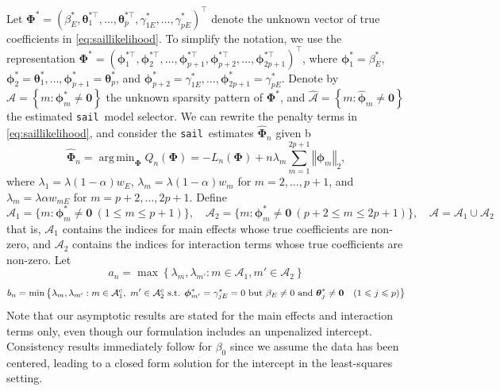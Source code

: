 \documentclass[useAMS,usenatbib,referee]{biom}
\newcommand{\ddd}{,\ldots,}
\newcommand{\sail}{\texttt{sail}}
\newcommand{\btheta}{\boldsymbol{\theta}}
\DeclareMathOperator*{\argmin}{arg\,min}
\newcommand{\A}{\mathcal{A}}
\begin{document}
{\normalsize{}Let $\boldsymbol{\Phi}^{*}=(\beta_{E}^{*},\btheta_{1}^{*\top},\ldots,\btheta_{p}^{*\top},\gamma_{1E}^{*},\ldots,\gamma_{pE}^{*})^{\top}$
	denote the unknown vector of true coefficients in \eqref{eq:saillikelihood}.
	To simplify the notation, we use the representation $\boldsymbol{\Phi}^{*}=(\boldsymbol{\phi}_{1}^{*\top},\boldsymbol{\phi}_{2}^{*\top},\ldots,\boldsymbol{\phi}_{p+1}^{*\top},\boldsymbol{\phi}_{p+2}^{*\top},\ldots,\boldsymbol{\phi}_{2p+1}^{*\top})^{\top}$,
	where $\boldsymbol{\phi}_{1}^{*}=\beta_{E}^{*}$, $\boldsymbol{\phi}_{2}^{*}=\boldsymbol{\theta}_{1}^{*}\ddd\boldsymbol{\phi}_{p+1}^{*}=\boldsymbol{\theta}_{p}^{*}$,
	and $\boldsymbol{\phi}_{p+2}^{*}=\gamma_{1E}^{*}\ddd\boldsymbol{\phi}_{2p+1}^{*}=\gamma_{pE}^{*}$.
	Denote by $\A=\left\lbrace m:\boldsymbol{\phi}_{m}^{*}\neq\mathbf{0}\right\rbrace $
	the unknown sparsity pattern of $\boldsymbol{\Phi}^{*}$, and $\widehat{\A}=\left\lbrace m:\widehat{\boldsymbol{\phi}}_{m}\neq\mathbf{0}\right\rbrace $
	the estimated \sail ~model selector. We can rewrite the penalty terms
	in \eqref{eq:saillikelihood}, and consider the \sail ~estimates $\widehat{\boldsymbol{\Phi}}_{n}$
	given b
	\begin{equation}
	\widehat{\boldsymbol{\Phi}}_{n}=\argmin_{\boldsymbol{\Phi}}Q_{n}(\boldsymbol{\Phi})=-L_{n}(\boldsymbol{\Phi})+n\lambda_{m}\sum_{m=1}^{2p+1}\left\Vert \boldsymbol{\phi}_{m}\right\Vert _{2},
	\end{equation}
	where $\lambda_{1}=\lambda(1-\alpha)w_{E}$, $\lambda_{m}=\lambda(1-\alpha)w_{m}$
	for $m=2,\ldots,p+1$, and $\lambda_{m}=\lambda\alpha w_{mE}$ for
	$m=p+2,\ldots,2p+1$. Define 
	\[
	\A_{1}=\{m:\boldsymbol{\phi}_{m}^{*}\neq\mathbf{0}\ (1\leq m\leq p+1)\},\quad\A_{2}=\{m:\boldsymbol{\phi}_{m}^{*}\neq\mathbf{0}\ (p+2\leq m\leq2p+1)\},\quad\A=\A_{1}\cup\A_{2}
	\]
	that is, $\A_{1}$ contains the indices for main effects whose true
	coefficients are non-zero, and $\A_{2}$ contains the indices for interaction
	terms whose true coefficients are non-zero. Let 
	\[
	a_{n}=\max\left\lbrace \lambda_{m},\lambda_{m'}:m\in\A_{1},m'\in\A_{2}\right\rbrace 
	\]
	\[
	b_{n}=\min\left\lbrace \lambda_{m},\lambda_{m'}:m\in\A_{1}^{c},\ m'\in\A_{2}^{c}\text{ s.t. }\text{\ensuremath{\boldsymbol{\phi}_{m'}^{*}}}=\gamma_{jE}^{*}=0\text{ but }\beta_{E}\neq0\text{ and }\btheta_{j}^{*}\neq\mathbf{0}\quad(1\leq j\leq p)\right\rbrace 
	\]
	Note that our asymptotic results are stated for the main effects and
	interaction terms only, even though our formulation includes an unpenalized
	intercept. Consistency results immediately follow for $\beta_{0}$
	since we assume the data has been centered, leading to a closed form
	solution for the intercept in the least-squares setting.}{\normalsize\par}
\end{document}
